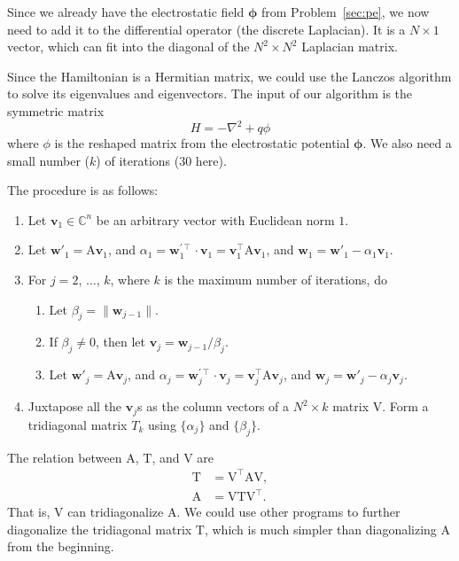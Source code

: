 \Answer{}
Since we already have the electrostatic field \(\bm{\phi}\) from Problem~\ref{sec:pe},
we now need to add it to the differential operator (the discrete Laplacian).
It is a \(N \times 1\) vector, which can fit into the diagonal of the
\(N^2 \times N^2\) Laplacian matrix.

Since the Hamiltonian is a Hermitian matrix, we could use the Lanczos algorithm to
solve its eigenvalues and eigenvectors.
The input of our algorithm is the symmetric matrix
%
\begin{equation}\label{eq:hamiltonian}
    H = -\nabla^2 + q \phi
\end{equation}
%
where \(\phi\) is the reshaped matrix from the electrostatic potential \(\bm{\phi}\).
We also need a small number ($k$) of iterations (\(30\) here).

The procedure is as follows:
%
\begin{enumerate}
    \item\label{it:v1} Let $\bm{v}_1 \in \mathbb{ C }^n$ be an arbitrary vector with
                       Euclidean norm $1$.
    \item Let $\bm{w}'_1 = \mathrm{A} \bm{v}_1$, and
          $\alpha_1 = \bm{w}^{\prime\intercal}_1 \cdot \bm{v}_1 = \bm{v}_1^\intercal \mathrm{A} \bm{v}_1$,
          and $\bm{w}_1 = \bm{w}'_1 - \alpha_1 \bm{v}_1$.
    \item For $j = 2$, $\ldots$, $k$, where $k$ is the maximum number of iterations, do
          \begin{enumerate}
              \item Let $\beta_j = \| \bm{w}_{j-1} \|$.
              \item If $\beta_j \neq 0$, then let $\bm{v}_j = \bm{w}_{j-1} / \beta_j$.
              \item Let $\bm{w}'_j = \mathrm{A} \bm{v}_j$, and
                    $\alpha_j = \bm{w}^{\prime\intercal}_j \cdot \bm{v}_j = \bm{v}_j^\intercal \mathrm{A} \bm{v}_j$,
                    and $\bm{w}_j = \bm{w}'_j - \alpha_j \bm{v}_j$.
          \end{enumerate}
    \item Juxtapose all the $\bm{v}_j$s as the
          column vectors of a $N^2 \times k$ matrix $\mathrm{V}$.
          Form a tridiagonal matrix $T_k$ using $\{\alpha_j\}$ and $\{\beta_j\}$.
\end{enumerate}
%
The relation between $\mathrm{A}$, $\mathrm{T}$, and $\mathrm{V}$ are
%
\begin{align}
    \mathrm{T} & = \mathrm{V}^\intercal \mathrm{A} \mathrm{V}, \\
    \mathrm{A} & = \mathrm{V} \mathrm{T} \mathrm{V}^\intercal.
\end{align}
%
That is, $\mathrm{V}$ can tridiagonalize $\mathrm{A}$.
We could use other programs to further diagonalize the tridiagonal matrix $\mathrm{T}$,
which is much simpler than diagonalizing $\mathrm{A}$ from the beginning.


